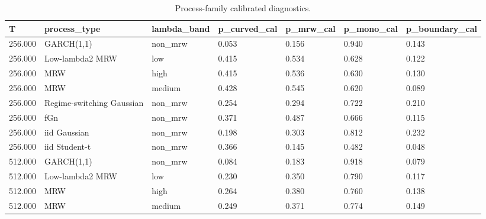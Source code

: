 \begin{table}[t]
\centering
\caption{Process-family calibrated diagnostics.}
\label{tab:table1_process_family_diagnostics}
\begin{tabular}{lllllll}
\toprule
T & process\_type & lambda\_band & p\_curved\_cal & p\_mrw\_cal & p\_mono\_cal & p\_boundary\_cal \\
\midrule
256.000 & GARCH(1,1) & non\_mrw & 0.053 & 0.156 & 0.940 & 0.143 \\
256.000 & Low-lambda2 MRW & low & 0.415 & 0.534 & 0.628 & 0.122 \\
256.000 & MRW & high & 0.415 & 0.536 & 0.630 & 0.130 \\
256.000 & MRW & medium & 0.428 & 0.545 & 0.620 & 0.089 \\
256.000 & Regime-switching Gaussian & non\_mrw & 0.254 & 0.294 & 0.722 & 0.210 \\
256.000 & fGn & non\_mrw & 0.371 & 0.487 & 0.666 & 0.115 \\
256.000 & iid Gaussian & non\_mrw & 0.198 & 0.303 & 0.812 & 0.232 \\
256.000 & iid Student-t & non\_mrw & 0.366 & 0.145 & 0.482 & 0.048 \\
512.000 & GARCH(1,1) & non\_mrw & 0.084 & 0.183 & 0.918 & 0.079 \\
512.000 & Low-lambda2 MRW & low & 0.230 & 0.350 & 0.790 & 0.117 \\
512.000 & MRW & high & 0.264 & 0.380 & 0.760 & 0.138 \\
512.000 & MRW & medium & 0.249 & 0.371 & 0.774 & 0.149 \\
\bottomrule
\end{tabular}
\end{table}
